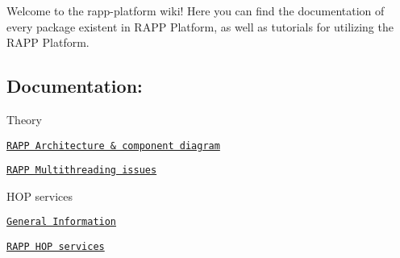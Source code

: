 Welcome to the rapp-\/platform wiki! Here you can find the documentation of every package existent in R\-A\-P\-P Platform, as well as tutorials for utilizing the R\-A\-P\-P Platform.

\subsection*{Documentation\-:}

Theory
\begin{DoxyItemize}
\item \href{https://github.com/rapp-project/rapp-platform/wiki/RAPP-Architecture}{\tt R\-A\-P\-P Architecture \& component diagram}
\item \href{https://github.com/rapp-project/rapp-platform/wiki/RAPP-Multithreading-issues}{\tt R\-A\-P\-P Multithreading issues}
\end{DoxyItemize}

H\-O\-P services
\begin{DoxyItemize}
\item \href{https://github.com/rapp-project/rapp-platform/wiki/HOP-Services---General-Information}{\tt General Information}
\item \href{https://github.com/rapp-project/rapp-platform/wiki/RAPP-HOP-services}{\tt R\-A\-P\-P H\-O\-P services}
\end{DoxyItemize}

